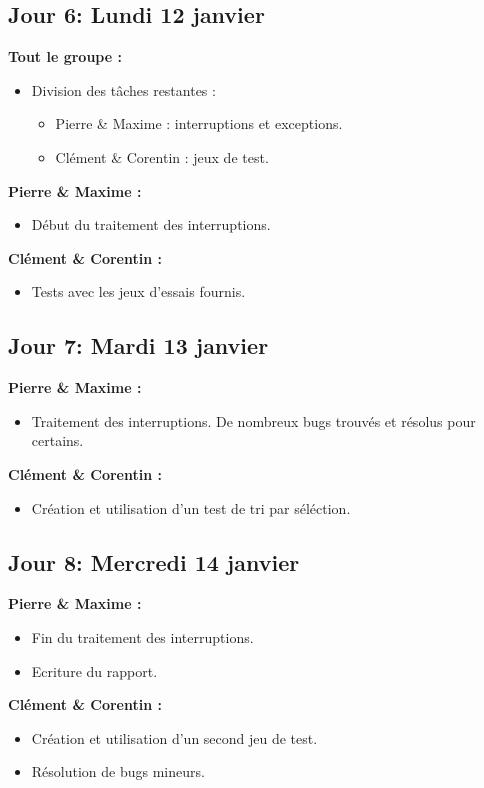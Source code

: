 \documentclass[11pt]{article} %
\begin{document}
\subsection{Jour 6: Lundi 12  janvier}
\textbf{Tout le groupe :}
\begin{itemize}
  \item Division des t\^aches restantes :
  \begin{itemize}
    \item Pierre \& Maxime : interruptions et exceptions.
    \item Cl\'ement \& Corentin : jeux de test.
  \end{itemize}
\end{itemize}
\textbf{Pierre \& Maxime :}
\begin{itemize}
  \item Début du traitement des interruptions.
\end{itemize}
\textbf{Cl\'ement \& Corentin :}
\begin{itemize}
  \item Tests avec les jeux d'essais fournis.
\end{itemize}

\subsection{Jour 7: Mardi 13  janvier}
\textbf{Pierre \& Maxime :}
\begin{itemize}
  \item Traitement des interruptions. De nombreux bugs trouvés et résolus pour certains.
\end{itemize}
\textbf{Cl\'ement \& Corentin :}
\begin{itemize}
  \item Création et utilisation d'un test de tri par s\'el\'ection. 
\end{itemize}

\subsection{Jour 8: Mercredi 14 janvier}
\textbf{Pierre \& Maxime :}
\begin{itemize}
  \item Fin du traitement des interruptions.
  \item Ecriture du rapport.
\end{itemize}
\textbf{Cl\'ement \& Corentin :}
\begin{itemize}
  \item Création et utilisation d'un second jeu de test.
  \item Résolution de bugs mineurs.
\end{itemize}
\end{document}
